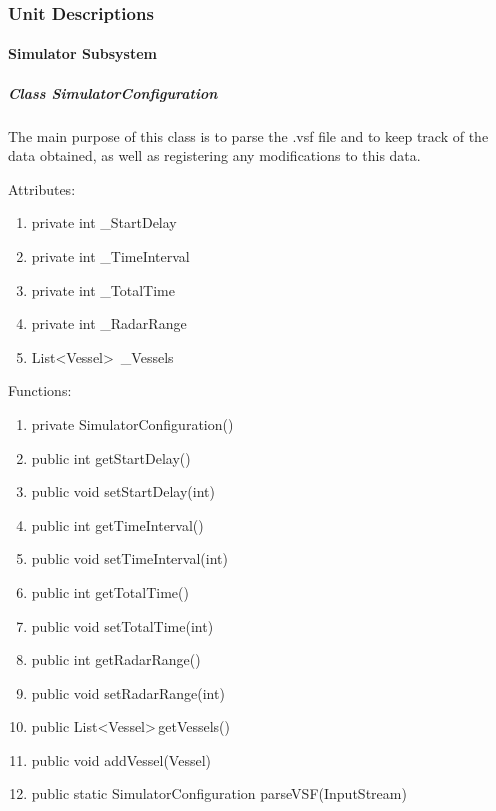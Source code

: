 \documentclass{article}
\begin{document}
\break

\subsubsection{Unit Descriptions} %

\paragraph{Simulator Subsystem}

\subparagraph{Class SimulatorConfiguration}
The main purpose of this class is to parse the .vsf file and to keep track of the data obtained, as well as registering any modifications to this data.

\vspace{0.5cm}

Attributes:
\begin{enumerate}
    \item private int \_StartDelay
    \item private int \_TimeInterval
    \item private int \_TotalTime
    \item private int \_RadarRange
    \item List\textless Vessel\textgreater \, \_Vessels
\end {enumerate}

\vspace{0.5cm}

Functions:
\begin{enumerate}
	\item private SimulatorConfiguration()
	\item public int getStartDelay()
	\item public void setStartDelay(int)
	\item public int getTimeInterval()
	\item public void setTimeInterval(int)
	\item public int getTotalTime()
	\item public void setTotalTime(int)
	\item public int getRadarRange()
	\item public void setRadarRange(int)
	\item public List\textless Vessel\textgreater  \,getVessels()
	\item public void addVessel(Vessel)
	\item public static SimulatorConfiguration parseVSF(InputStream)
\end{enumerate}
\end{document}
